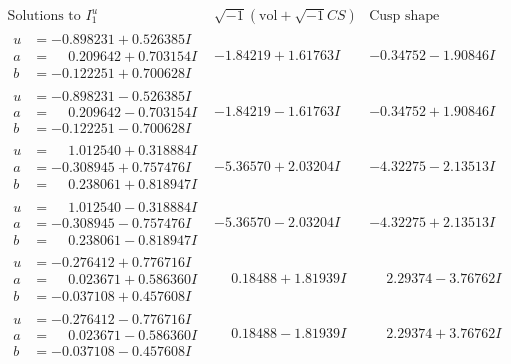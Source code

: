 \documentclass[1p]{elsarticle_modified}
\theoremstyle{definition}
\newcommand{\I}{\sqrt{-1}}
\begin{document}
$$\begin{array}{c|c|c}  
\text{Solutions to }I^u_{1}& \I (\text{vol} + \sqrt{-1}CS) & \text{Cusp shape}\\
 \hline 
\begin{aligned}
u &= -0.898231 + 0.526385 I \\
a &= \phantom{-}0.209642 + 0.703154 I \\
b &= -0.122251 + 0.700628 I\end{aligned}
 & -1.84219 + 1.61763 I & -0.34752 - 1.90846 I \\ \hline\begin{aligned}
u &= -0.898231 - 0.526385 I \\
a &= \phantom{-}0.209642 - 0.703154 I \\
b &= -0.122251 - 0.700628 I\end{aligned}
 & -1.84219 - 1.61763 I & -0.34752 + 1.90846 I \\ \hline\begin{aligned}
u &= \phantom{-}1.012540 + 0.318884 I \\
a &= -0.308945 + 0.757476 I \\
b &= \phantom{-}0.238061 + 0.818947 I\end{aligned}
 & -5.36570 + 2.03204 I & -4.32275 - 2.13513 I \\ \hline\begin{aligned}
u &= \phantom{-}1.012540 - 0.318884 I \\
a &= -0.308945 - 0.757476 I \\
b &= \phantom{-}0.238061 - 0.818947 I\end{aligned}
 & -5.36570 - 2.03204 I & -4.32275 + 2.13513 I \\ \hline\begin{aligned}
u &= -0.276412 + 0.776716 I \\
a &= \phantom{-}0.023671 + 0.586360 I \\
b &= -0.037108 + 0.457608 I\end{aligned}
 & \phantom{-}0.18488 + 1.81939 I & \phantom{-}2.29374 - 3.76762 I \\ \hline\begin{aligned}
u &= -0.276412 - 0.776716 I \\
a &= \phantom{-}0.023671 - 0.586360 I \\
b &= -0.037108 - 0.457608 I\end{aligned}
 & \phantom{-}0.18488 - 1.81939 I & \phantom{-}2.29374 + 3.76762 I \\ \hline\begin{aligned}

\end{aligned}
\end{array}$$
\end{document}
